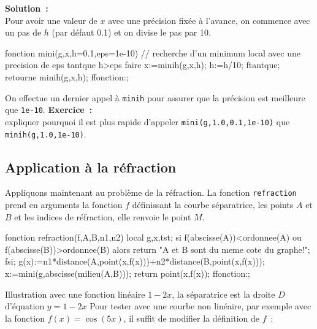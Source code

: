\documentclass[12pt,a4paper]{book}
\begin{document}
\begin{giacjshere}
{\bf Solution~:}\\
Pour avoir une valeur de $x$ avec une pr\'ecision fix\'ee \`a l'avance,
on commence avec un pas de $h$ (par d\'efaut 0.1) et on divise le pas
par 10.
\begin{giaconload}
fonction mini(g,x,h=0.1,eps=1e-10) 
  // recherche d'un minimum local avec une precision de eps
  tantque h>eps faire
    x:=minih(g,x,h);
    h:=h/10;
  ftantque;
  retourne minih(g,x,h);
ffonction:;
\end{giaconload}
On effectue un dernier appel \`a \verb|minih| pour assurer que la 
pr\'ecision est meilleure que \verb|1e-10|.
{\bf Exercice~:} \\
expliquer pourquoi il est plus rapide d'appeler 
\verb|mini(g,1.0,0.1,1e-10)| que \verb|minih(g,1.0,1e-10)|.

\subsection{Application \`a la r\'efraction}
Appliquons maintenant au probl\`eme de la r\'efraction.
La fonction \verb|refraction|
prend en arguments la fonction $f$ d\'efinissant la courbe s\'eparatrice,
les points $A$ et $B$ et les indices de r\'efraction, elle
renvoie le point $M$. 
\begin{giaconload}
fonction refraction(f,A,B,n1,n2)
  local g,x,tst;
  si f(abscisse(A))<ordonnee(A) ou f(abscisse(B))>ordonnee(B) alors 
    return "A et B sont du meme cote du graphe!"; 
  fsi;
  g(x):=n1*distance(A,point(x,f(x)))+n2*distance(B,point(x,f(x))); 
  x:=mini(g,abscisse(milieu(A,B)));
  return point(x,f(x));
ffonction:;
\end{giaconload}
Illustration avec une fonction lin\'eaire $1-2x$, 
la s\'eparatrice est la droite $D$ d'\'equation $y=1-2x$
Pour tester avec une courbe non lin\'eaire, par
exemple avec la fonction $f(x)=\cos(5x)$, il suffit de modifier la d\'efinition
de $f$~:



\end{giacjshere}
\end{document}
